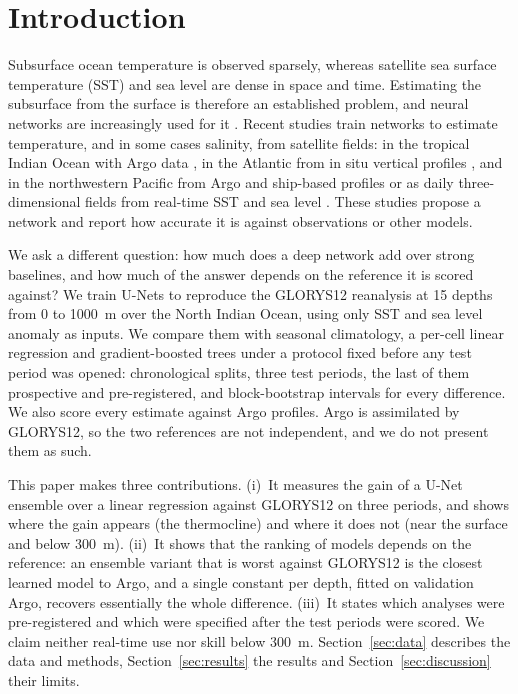 
\section{Introduction}
\label{sec:intro}
Subsurface ocean temperature is observed sparsely, whereas satellite sea surface temperature (SST) and sea level are dense in space and time. Estimating the subsurface from the surface is therefore an established problem, and neural networks are increasingly used for it \cite{smith2023}. Recent studies train networks to estimate temperature, and in some cases salinity, from satellite fields: in the tropical Indian Ocean with Argo data \cite{qi2023}, in the Atlantic from in situ vertical profiles \cite{smith2023}, and in the northwestern Pacific from Argo and ship-based profiles \cite{chae2026} or as daily three-dimensional fields from real-time SST and sea level \cite{wang2026}. These studies propose a network and report how accurate it is against observations or other models.

We ask a different question: how much does a deep network add over strong baselines, and how much of the answer depends on the reference it is scored against? We train U-Nets \cite{unet} to reproduce the GLORYS12 reanalysis \cite{glorys12} at 15 depths from 0 to 1000~m over the North Indian Ocean, using only SST \cite{ostia} and sea level anomaly \cite{duacs} as inputs. We compare them with seasonal climatology, a per-cell linear regression and gradient-boosted trees \cite{xgboost} under a protocol fixed before any test period was opened: chronological splits, three test periods, the last of them prospective and pre-registered, and block-bootstrap intervals for every difference. We also score every estimate against Argo profiles. Argo is assimilated by GLORYS12, so the two references are not independent, and we do not present them as such.

This paper makes three contributions. (i)~It measures the gain of a U-Net ensemble over a linear regression against GLORYS12 on three periods, and shows where the gain appears (the thermocline) and where it does not (near the surface and below 300~m). (ii)~It shows that the ranking of models depends on the reference: an ensemble variant that is worst against GLORYS12 is the closest learned model to Argo, and a single constant per depth, fitted on validation Argo, recovers essentially the whole difference. (iii)~It states which analyses were pre-registered and which were specified after the test periods were scored. We claim neither real-time use nor skill below 300~m. Section~\ref{sec:data} describes the data and methods, Section~\ref{sec:results} the results and Section~\ref{sec:discussion} their limits.
